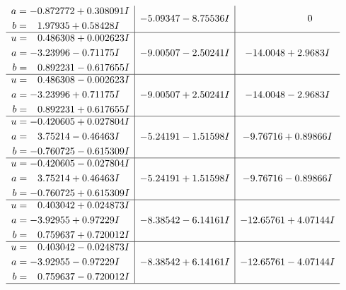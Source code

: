 \documentclass[1p]{elsarticle_modified}
\theoremstyle{definition}
\begin{document}
$$\begin{array}{c|c|c}
\begin{aligned}
a &= -0.872772 + 0.308091 I \\
b &= \phantom{-}1.97935 + 0.58428 I\end{aligned}
 & -5.09347 - 8.75536 I & \phantom{-0.000000 } 0 \\ \hline\begin{aligned}
u &= \phantom{-}0.486308 + 0.002623 I \\
a &= -3.23996 - 0.71175 I \\
b &= \phantom{-}0.892231 - 0.617655 I\end{aligned}
 & -9.00507 - 2.50241 I & -14.0048 + 2.9683 I \\ \hline\begin{aligned}
u &= \phantom{-}0.486308 - 0.002623 I \\
a &= -3.23996 + 0.71175 I \\
b &= \phantom{-}0.892231 + 0.617655 I\end{aligned}
 & -9.00507 + 2.50241 I & -14.0048 - 2.9683 I \\ \hline\begin{aligned}
u &= -0.420605 + 0.027804 I \\
a &= \phantom{-}3.75214 - 0.46463 I \\
b &= -0.760725 - 0.615309 I\end{aligned}
 & -5.24191 - 1.51598 I & -9.76716 + 0.89866 I \\ \hline\begin{aligned}
u &= -0.420605 - 0.027804 I \\
a &= \phantom{-}3.75214 + 0.46463 I \\
b &= -0.760725 + 0.615309 I\end{aligned}
 & -5.24191 + 1.51598 I & -9.76716 - 0.89866 I \\ \hline\begin{aligned}
u &= \phantom{-}0.403042 + 0.024873 I \\
a &= -3.92955 + 0.97229 I \\
b &= \phantom{-}0.759637 + 0.720012 I\end{aligned}
 & -8.38542 - 6.14161 I & -12.65761 + 4.07144 I \\ \hline\begin{aligned}
u &= \phantom{-}0.403042 - 0.024873 I \\
a &= -3.92955 - 0.97229 I \\
b &= \phantom{-}0.759637 - 0.720012 I\end{aligned}
 & -8.38542 + 6.14161 I & -12.65761 - 4.07144 I\\
 \hline 
 \end{array}$$\newpage$$\begin{array}{c|c|c}  

\end{array}$$
\end{document}
